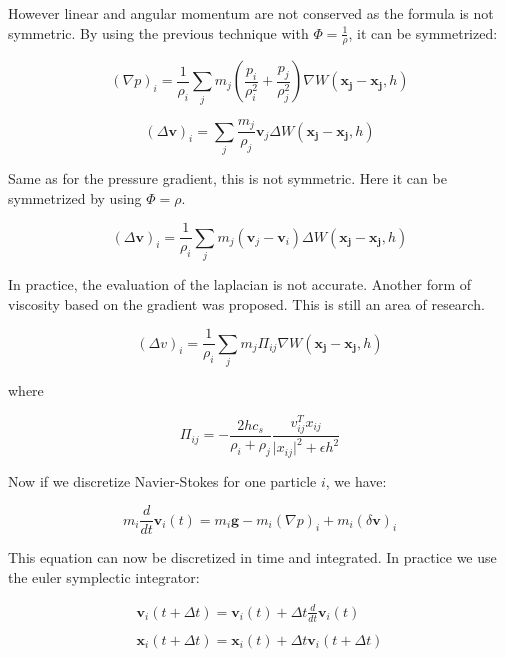 However linear and angular momentum are not conserved as the formula is not symmetric. By using the previous technique with $\Phi = \frac{1}{\rho}$, it can be symmetrized:

\begin{equation}
\left(\nabla p\right)_{i} = 
\frac{1}{\rho_{i}}
\sum_{j} m_{j} \left( \frac{p_{i}}{\rho_{i}^{2}} + \frac{p_{j}}{\rho_{j}^{2}} \right) \nabla W(\mathbf{x_{j}}-\mathbf{x_{j}},h)
\end{equation}

\begin{equation}
\left(\Delta \mathbf{v}\right)_{i} = \sum_{j} \frac{m_{j}}{\rho_{j}} \mathbf{v}_{j} \Delta W(\mathbf{x_{j}}-\mathbf{x_{j}},h)
\end{equation}

Same as for the pressure gradient, this is not symmetric. Here it can be symmetrized by using $\Phi = \rho$.

\begin{equation}
\left(\Delta \mathbf{v}\right)_{i} = \frac{1}{\rho_{i}}\sum_{j} m_{j} \left( \mathbf{v}_{j}-\mathbf{v}_{i}\right) \Delta W(\mathbf{x_{j}}-\mathbf{x_{j}},h)
\end{equation}

In practice, the evaluation of the laplacian is not accurate. Another form of viscosity based on the gradient was proposed. This is still an area of research.

\begin{equation}
\left(\Delta v\right)_{i} = 
\frac{1}{\rho_{i}}
\sum_{j} m_{j} \Pi_{ij} \nabla W(\mathbf{x_{j}}-\mathbf{x_{j}},h)
\end{equation}

where 

\begin{equation}
\Pi_{ij} = -\frac{2hc_{s}}{\rho_{i}+\rho_{j}}\frac{v_{ij}^{T}x_{ij}}{\vert x_{ij} \vert^{2} + \epsilon h^{2}}
\end{equation}

Now if we discretize Navier-Stokes for one particle $i$, we have:

\begin{equation}
m_{i}\frac{d}{dt}\mathbf{v}_{i}(t) = m_{i}\mathbf{g} - m_{i}(\nabla p)_{i} + m_{i}(\delta \mathbf{v})_{i}
\end{equation}

This equation can now be discretized in time and integrated. In practice we use the euler symplectic integrator:

\begin{equation}
\begin{array}{ll}
\displaystyle \mathbf{v}_{i}(t+\Delta t) = \mathbf{v}_{i}(t) + \Delta t \frac{d}{dt}\mathbf{v}_{i}(t) \\ \\
\displaystyle \mathbf{x}_{i}(t+\Delta t) = \mathbf{x}_{i}(t) + \Delta t \mathbf{v}_{i}(t+\Delta t)
\end{array}
\end{equation}

